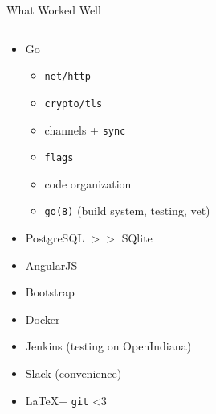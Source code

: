 \documentclass[11pt,aspectratio=169]{beamer}
\begin{document}
    \begin{frame}{What Worked Well}
            \begin{columns}
            \begin{column}{0.6\linewidth}
              \begin{itemize}
                \item<2-> Go
                    \begin{itemize}
                      \item<3-> \texttt{net/http}
                      \item<4-> \texttt{crypto/tls}
                      \item<5-> channels + \texttt{sync}
                      \item<6-> \texttt{flags}
                      \item<7-> code organization
                      \item<8-> \texttt{go(8)} (build system, testing, vet)
                    \end{itemize}
                \item<9-> PostgreSQL $>>$ SQlite 
                \item<10-> AngularJS 
                \item<11-> Bootstrap 
                \item<12-> Docker 
                \item<13-> Jenkins (testing on OpenIndiana)
                \item<14-> Slack (convenience)
                \item<15-> \LaTeX + \texttt{git} <3
              \end{itemize}
            \end{column}
            \begin{column}{0.4\linewidth}
                \begin{tabular}{ll}

\end{tabular}
\end{column}
\end{columns}
\end{frame}
\end{document}
